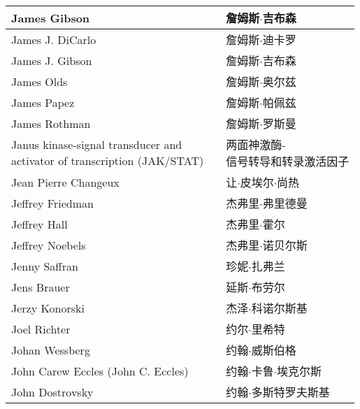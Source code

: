 \begin{longtable}{lll}
	\midrule
	James Gibson   && 詹姆斯$\cdot$吉布森  \\
	
	\midrule
	James J. DiCarlo   && 詹姆斯$\cdot$迪卡罗  \\
	
	\midrule
	James J. Gibson   && 詹姆斯$\cdot$吉布森  \\
	
	\midrule
	James Olds   && 詹姆斯$\cdot$奥尔兹  \\
	
	\midrule
	James Papez   && 詹姆斯$\cdot$帕佩兹  \\
	
	\midrule
	James Rothman   && 詹姆斯$\cdot$罗斯曼  \\
	
	\midrule
	\makecell[l]{Janus kinase-signal transducer and \\activator of transcription (JAK/STAT)}  && \makecell[l]{两面神激酶-\\信号转导和转录激活因子}  \\
	
	\midrule
	Jean Pierre Changeux   && 让$\cdot$皮埃尔$\cdot$尚热  \\
	
	\midrule
	Jeffrey Friedman   && 杰弗里$\cdot$弗里德曼  \\
	
	\midrule
	Jeffrey Hall   && 杰弗里$\cdot$霍尔  \\
	
	\midrule
	Jeffrey Noebels   && 杰弗里$\cdot$诺贝尔斯  \\
	
	\midrule
	Jenny Saffran   && 珍妮$\cdot$扎弗兰  \\
	
	\midrule
	Jens Brauer   && 延斯$\cdot$布劳尔  \\
	
	\midrule
	Jerzy Konorski   && 杰泽$\cdot$科诺尔斯基  \\
	
	\midrule
	Joel Richter   && 约尔$\cdot$里希特  \\
	
	\midrule
	Johan Wessberg   && 约翰$\cdot$威斯伯格  \\
	
	\midrule
	John Carew Eccles (John C. Eccles)   && 约翰$\cdot$卡鲁$\cdot$埃克尔斯  \\
	
	\midrule
	John Dostrovsky   && 约翰$\cdot$多斯特罗夫斯基  \\
	

\end{longtable}
